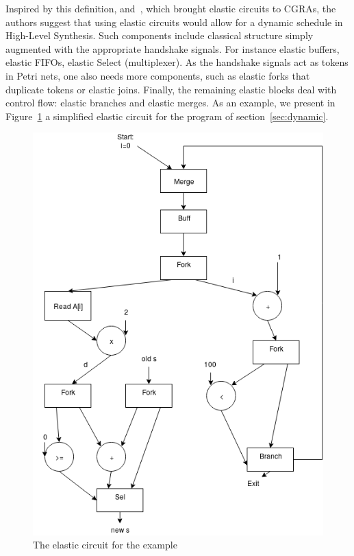 \documentclass{article}
\begin{document}
Inspired by this definition, and~\cite{DBLP:conf/fpga/HuangITCW13}, which brought elastic circuits to CGRAs, the authors suggest that using elastic circuits would allow for a dynamic schedule in High-Level Synthesis.
Such components include classical structure simply augmented with the appropriate handshake signals. For instance elastic buffers, elastic FIFOs, elastic Select (multiplexer). As the handshake signals act as tokens in Petri nets, one also needs more components, such as elastic forks that duplicate tokens or elastic joins. Finally, the remaining elastic blocks deal with control flow: elastic branches and elastic merges.
As an example, we present in Figure~\ref{fig:elastic} a simplified elastic circuit for the program of section~\ref{sec:dynamic}.
\begin{figure}
  \center
  \includegraphics[scale=0.3]{circuit.png}
  \caption{The elastic circuit for the example}
  \label{fig:elastic}
\end{figure}
\end{document}
